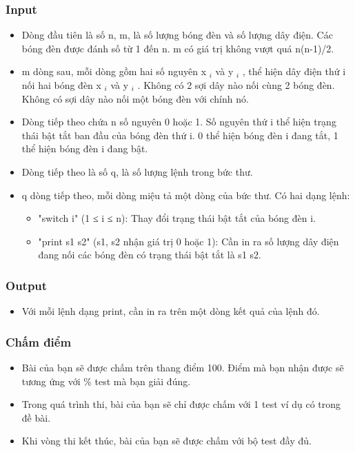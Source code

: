 \subsubsection{Input}
\begin{itemize}
	\item Dòng đầu tiên là số n, m, là số lượng bóng đèn và số lượng dây điện. Các bóng đèn được đánh số từ 1 đến n. m có giá trị không vượt quá n(n-1)/2.
	\item m dòng sau, mỗi dòng gồm hai số nguyên x $_ i $ và y $_ i $ , thể hiện dây điện thứ i nối hai bóng đèn x $_ i $ và y $_ i $ . Không có 2 sợi dây nào nối cùng 2 bóng đèn. Không có sợi dây nào nối một bóng đèn với chính nó.
	\item Dòng tiếp theo chứa n số nguyên 0 hoặc 1. Số nguyên thứ i thể hiện trạng thái bật tắt ban đầu của bóng đèn thứ i. 0 thể hiện bóng đèn i đang tắt, 1 thể hiện bóng đèn i đang bật.
	\item Dòng tiếp theo là số q, là số lượng lệnh trong bức thư.
	\item q dòng tiếp theo, mỗi dòng miệu tả một dòng của bức thư. Có hai dạng lệnh:
\begin{itemize}
	\item "switch i" (1 ≤ i ≤ n): Thay đổi trạng thái bật tắt của bóng đèn i.
	\item "print s1 s2" (s1, s2 nhận giá trị 0 hoặc 1): Cần in ra số lượng dây điện đang nối các bóng đèn có trạng thái bật tắt là s1 s2.
\end{itemize}
\end{itemize}

\subsubsection{Output}
\begin{itemize}
	\item Với mỗi lệnh dạng print, cần in ra trên một dòng kết quả của lệnh đó.
\end{itemize}

\subsubsection{Chấm điểm}
\begin{itemize}
	\item Bài của bạn sẽ được chấm trên thang điểm 100. Điểm mà bạn nhận được sẽ tương ứng với \% test mà bạn giải đúng.
	\item Trong quá trình thi, bài của bạn sẽ chỉ được chấm với 1 test ví dụ có trong đề bài.
	\item Khi vòng thi kết thúc, bài của bạn sẽ được chấm với bộ test đầy đủ.
\end{itemize}

